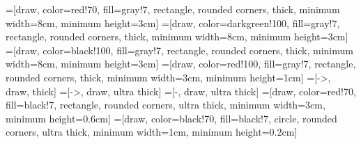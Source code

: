 =[draw, color=red!70, fill=gray!7, rectangle, rounded
corners, thick, minimum width=8cm, minimum height=3cm]
=[draw, color=darkgreen!100, fill=gray!7, rectangle, rounded
corners, thick, minimum width=8cm, minimum height=3cm]
=[draw, color=black!100, fill=gray!7, rectangle, rounded
corners, thick, minimum width=8cm, minimum height=3cm]
=[draw, color=red!100, fill=gray!7, rectangle, rounded
corners, thick, minimum width=3cm, minimum height=1cm]
=[->, draw, thick]
=[->, draw, ultra thick]
=[-, draw, ultra thick]
=[draw, color=red!70, fill=black!7, rectangle, rounded
corners, ultra thick, minimum width=3cm, minimum height=0.6cm]
=[draw, color=black!70, fill=black!7, circle, rounded
corners, ultra thick, minimum width=1cm, minimum height=0.2cm]
\newcommand\framepicture[1]{
\begin{center}
                \begin{tikzpicture}
                        \node[taskRect] at (0,3) {
                        \begin{minipage}[t][4cm]{7cm}
                \texttt{[image: \#1]} 
                \end{minipage}
                };
        \end{tikzpicture}
\end{center}
}
\newcommand\drawDirectedGraph[2]{
\node[nUnit] (h) at (#2,#1) {h};
\node[nUnit] (v1) at (#2-1,#1-2) {v1};
\node[nUnit] (v2) at (#2+1,#1-2) {v2};
\draw[darrow] (v1) -- (h);
\draw[darrow] (v2) -- (h);
\draw[darrow] (h) -- (#2,#1+1);
}
\newcommand\drawUndirectedGraph[2]{
        \node[nUnit] (uh) at (#2,#1) {h};
        \node[nUnit] (uv1) at (#2-1,#1-2) {v1};
        \node[nUnit] (uv2) at (#2+1,#1-2) {v2};
        \draw[uarrow] (uv1) -- (uh);
        \draw[uarrow] (uv2) -- (uh);
}
\newcommand\drawRBM[2]{
        \node[nUnit] (uh0) at (#2-1.5,#1) {h0};
        \node[nUnit] (uh1) at (#2,#1) {h1};
        \node[nUnit] (uh2) at (#2+1.5,#1) {h2};
        \node[nUnit] (uv1) at (#2-1,#1-2) {v1};
        \node[nUnit] (uv2) at (#2+1,#1-2) {v2};
        \draw[uarrow] (uv1) -- (uh0);
        \draw[uarrow] (uv1) -- (uh1);
        \draw[uarrow] (uv1) -- (uh2);
        \draw[uarrow] (uv2) -- (uh0);
        \draw[uarrow] (uv2) -- (uh1);
        \draw[uarrow] (uv2) -- (uh2);
}
